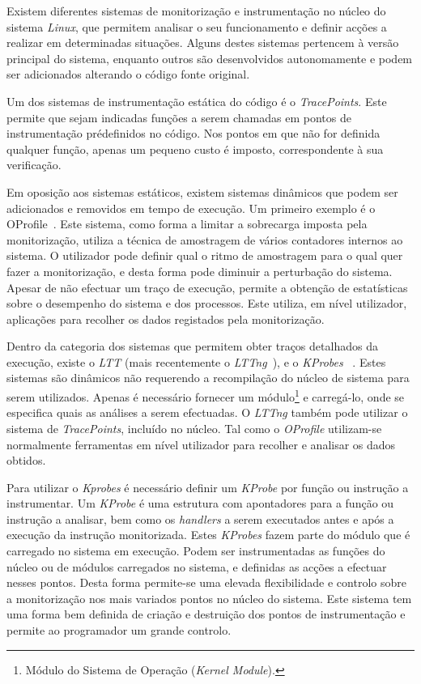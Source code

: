 \documentclass[a4paper]{llncs}
\newcommand{\td}[1]{\todo[inline]{#1}}
\begin{document}
Existem diferentes sistemas de monitorização e instrumentação no núcleo do sistema \textit{Linux}, que permitem analisar o seu funcionamento e definir acções a realizar em determinadas situações.
 Alguns destes sistemas pertencem à versão principal do sistema, enquanto outros são desenvolvidos autonomamente e podem ser adicionados alterando o código fonte original. 

Um dos sistemas de instrumentação estática do código é o \textit{TracePoints}.
 Este permite que sejam indicadas funções a serem chamadas em pontos de instrumentação prédefinidos no código.
 Nos pontos em que não for definida qualquer função, apenas um pequeno custo é imposto, correspondente à sua verificação. 

Em oposição aos sistemas estáticos, existem sistemas dinâmicos que podem  ser adicionados e removidos em tempo de execução. Um primeiro exemplo é o OProfile~\cite{oprofile}. 
Este sistema, como forma a limitar a sobrecarga imposta pela monitorização, utiliza a técnica de amostragem de vários contadores internos ao sistema. O utilizador pode definir qual o ritmo de amostragem para o qual quer fazer a monitorização, e desta forma pode diminuir a perturbação do sistema.
 Apesar de não efectuar um traço de execução, permite a obtenção de estatísticas sobre o desempenho do sistema e dos processos.
 Este utiliza, em nível utilizador, aplicações para recolher os dados registados pela monitorização.

Dentro da categoria dos sistemas que permitem obter traços detalhados da execução, existe o \textit{LTT} (mais recentemente o \textit{LTTng}~\cite{Mathieu2009}), e o \textit{KProbes} ~\cite{kernel_debug_printk_on_fly}. %
Estes sistemas são dinâmicos não requerendo a recompilação do núcleo de sistema para serem utilizados.
 Apenas é necessário fornecer um módulo\footnote{Módulo do Sistema de Operação (\textit{Kernel Module}).} e carregá-lo, onde se especifica quais as análises a serem efectuadas.
 O \textit{LTTng} também pode utilizar o sistema de \textit{TracePoints}, incluído no núcleo. Tal como o \textit{OProfile} utilizam-se normalmente ferramentas em nível utilizador para recolher e analisar os dados obtidos.

Para utilizar o \textit{Kprobes} é necessário definir um \textit{KProbe} por função ou instrução a instrumentar.
 Um \textit{KProbe} é uma estrutura com apontadores para a função ou instrução a analisar, bem como os \textit{handlers} a serem executados antes e após a execução da instrução monitorizada.
 Estes \textit{KProbes} fazem parte do módulo que é carregado no sistema em execução.
Podem ser instrumentadas as funções do núcleo ou de módulos carregados no sistema, e definidas as acções a efectuar nesses pontos.
Desta forma permite-se uma elevada flexibilidade e controlo sobre a monitorização nos mais variados pontos no núcleo do sistema.
Este sistema tem uma forma bem definida de criação e destruição dos pontos de instrumentação e permite ao programador um grande controlo.
\end{document}
